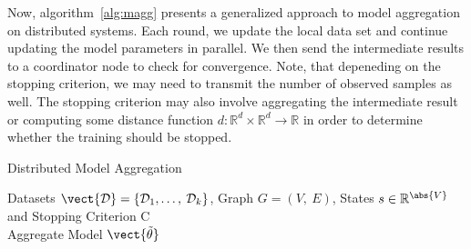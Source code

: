 Now, algorithm~\ref{alg:magg} presents a generalized approach to model aggregation on distributed systems. 
Each round, we update the local data set and continue updating the model parameters in parallel. 
We then send the intermediate results to a coordinator node to check for convergence.
Note, that depeneding on the stopping criterion, we may need to transmit the number of observed samples as well. 
The stopping criterion may also involve aggregating the intermediate result or computing some distance function $d: \mathbb{R}^d \times \mathbb{R}^d  \rightarrow \mathbb{R}$ in order to determine whether the training should be stopped.
\begin{algo}{Distributed Model Aggregation}
    \begin{algorithm}[H]
    \caption[Distributed Learning with PGMs]{General approach to distributed learning. While to stopping criterion $C$ has not been fulfilled the distributed learners update the observed data in each round and train a new or updated model. Afterwards, the local parameters are sent to the coordinator and aggregated with some aggregation algorithm.}
        \begin{algorithmic}[1]
            \label{alg:magg}
            \REQUIRE Datasets $\mathcal{\vect{D}} = \{\mathcal{D}_1, \ldots,\: \mathcal{D}_k\}$, Graph $G=(V,\:E)$, States $s \in \mathbb{R}^{\abs{V}}$ and Stopping Criterion C \\
            \ENSURE Aggregate Model $\vect{\tilde{\theta}}$  \\
             \\
             \\
            \\
                 \\
            \ENDIF
            \ENDWHILE
            \RETURN {$\vect{\tilde{\theta}}$}
        \end{algorithmic}
    \end{algorithm}
\end{algo}

